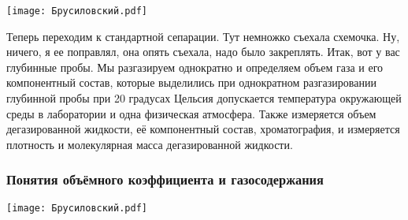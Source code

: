 \documentclass[main.tex]{subfiles}
\begin{document}
\begin{center}
\texttt{[image: Брусиловский.pdf]}
\end{center}

Теперь переходим к стандартной сепарации.
Тут немножко съехала схемочка.
Ну, ничего, я ее поправлял, она опять съехала, надо было закреплять.
Итак, вот у вас глубинные пробы.
Мы разгазируем однократно и определяем объем газа и его компонентный состав, которые выделились при однократном разгазировании глубинной пробы при 20 градусах Цельсия допускается температура окружающей среды в лаборатории и одна физическая атмосфера.
Также измеряется объем дегазированной жидкости, её компонентный состав, хроматография, и измеряется плотность и молекулярная масса дегазированной жидкости.

\subsubsection{Понятия объёмного коэффициента и газосодержания}

\begin{center}
\texttt{[image: Брусиловский.pdf]}
\end{center}
\end{document}
